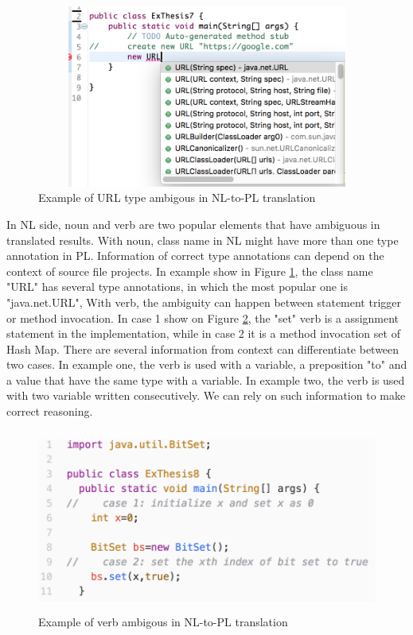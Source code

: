 \begin{figure}[htp]
	\centering
	\includegraphics[width=14cm,height=6cm]{resources/fig_url_ambiguous_example.png}%
	\caption[Example of URL type ambigous in NL-to-PL translation]{Example of URL type ambigous in NL-to-PL translation} 
	\label{fig:UrlAmbiguousExample}
\end{figure}

In NL side, noun and verb are two popular elements that have ambiguous in translated results. With noun, class name in NL might have more than one type annotation in PL. Information of correct type annotations can depend on the context of source file projects. In example show in Figure \ref{fig:UrlAmbiguousExample}, the class name "URL" has several type annotations, in which the most popular one is "java.net.URL", With verb, the ambiguity can happen between statement trigger or method invocation. In case 1 show on Figure \ref{fig:VerbAmbiguousExample}, the "set" verb is a assignment statement in the implementation, while in case 2 it is a method invocation set of Hash Map. There are several information from context can differentiate between two cases. In example one, the verb is used with a variable, a preposition "to" and a value that have the same type with a variable. In example two, the verb is used with two variable written consecutively. We can rely on such information to make correct reasoning.  \\

\begin{figure}[htp]
	\centering
	\includegraphics[width=14cm,height=6cm]{resources/fig_set_ambiguous_example.png}%
	\caption[Example of verb ambigous in NL-to-PL translation]{Example of verb ambigous in NL-to-PL translation} 
	\label{fig:VerbAmbiguousExample}
\end{figure}

